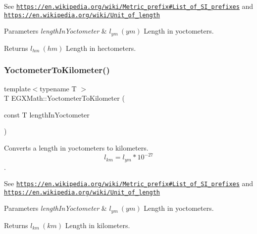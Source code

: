 See \href{https://en.wikipedia.org/wiki/Metric_prefix#List_of_SI_prefixes}{\tt https\+://en.\+wikipedia.\+org/wiki/\+Metric\+\_\+prefix\#\+List\+\_\+of\+\_\+\+S\+I\+\_\+prefixes} and \href{https://en.wikipedia.org/wiki/Unit_of_length}{\tt https\+://en.\+wikipedia.\+org/wiki/\+Unit\+\_\+of\+\_\+length} 
\begin{DoxyParams}{Parameters}
{\em length\+In\+Yoctometer} & $ l_{ym}\ (ym)$ Length in yoctometers. \\
\hline
\end{DoxyParams}
\begin{DoxyReturn}{Returns}
$ l_{hm}\ (hm)$ Length in hectometers. 
\end{DoxyReturn}
\mbox{\label{group___e_g_x_math-_conversions-_length_conversions-_s_i-_yoctometer-_s_i_ga5736155a6aad5dc3b7b98706bda51484}} 
\subsubsection{\texorpdfstring{Yoctometer\+To\+Kilometer()}{YoctometerToKilometer()}}
{\footnotesize\ttfamily template$<$typename T $>$ \\
T E\+G\+X\+Math\+::\+Yoctometer\+To\+Kilometer (\begin{DoxyParamCaption}\item[{const T}]{length\+In\+Yoctometer }\end{DoxyParamCaption})}



Converts a length in yoctometers to kilometers. \[ l_{km}=l_{ym} * 10^{-27} \]. 

See \href{https://en.wikipedia.org/wiki/Metric_prefix#List_of_SI_prefixes}{\tt https\+://en.\+wikipedia.\+org/wiki/\+Metric\+\_\+prefix\#\+List\+\_\+of\+\_\+\+S\+I\+\_\+prefixes} and \href{https://en.wikipedia.org/wiki/Unit_of_length}{\tt https\+://en.\+wikipedia.\+org/wiki/\+Unit\+\_\+of\+\_\+length} 
\begin{DoxyParams}{Parameters}
{\em length\+In\+Yoctometer} & $ l_{ym}\ (ym)$ Length in yoctometers. \\
\hline
\end{DoxyParams}
\begin{DoxyReturn}{Returns}
$ l_{km}\ (km)$ Length in kilometers. 
\end{DoxyReturn}
\mbox{\label{group___e_g_x_math-_conversions-_length_conversions-_s_i-_yoctometer-_s_i_ga638081d766f4299ceede9574c1c3242b}} 
